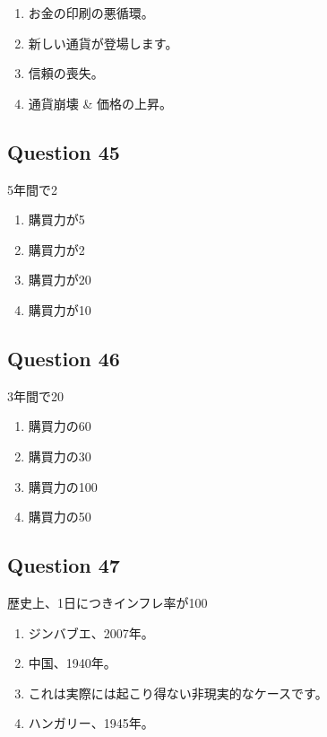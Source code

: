 \documentclass[12pt,a4paper]{article}
\begin{document}
\begin{enumerate}[label=\Alph*., leftmargin=*]
\item お金の印刷の悪循環。
\item 新しい通貨が登場します。
\item 信頼の喪失。
\item 通貨崩壊 & 価格の上昇。
\end{enumerate}

\bigskip


\subsection*{Question 45}
5年間で2%

\begin{enumerate}[label=\Alph*., leftmargin=*]
\item 購買力が5%
\item 購買力が2%
\item 購買力が20%
\item 購買力が10%
\end{enumerate}

\bigskip


\subsection*{Question 46}
3年間で20%

\begin{enumerate}[label=\Alph*., leftmargin=*]
\item 購買力の60%
\item 購買力の30%
\item 購買力の100%
\item 購買力の50%
\end{enumerate}

\bigskip


\subsection*{Question 47}
歴史上、1日につきインフレ率が100%

\begin{enumerate}[label=\Alph*., leftmargin=*]
\item ジンバブエ、2007年。
\item 中国、1940年。
\item これは実際には起こり得ない非現実的なケースです。
\item ハンガリー、1945年。
\end{enumerate}
\end{document}

